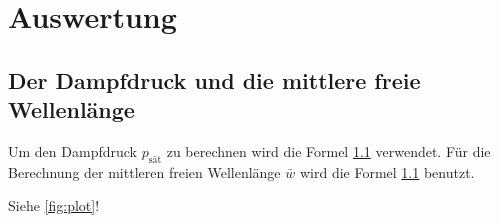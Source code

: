 \section{Auswertung}
\label{sec:Auswertung}

\subsection{Der Dampfdruck und die mittlere freie Wellenlänge}

Um den Dampfdruck $p_\text{sät}$ zu berechnen wird die Formel \ref{} verwendet.
Für die Berechnung der mittleren freien Wellenlänge $\bar{w}$ wird die Formel \ref{} benutzt.



Siehe \autoref{fig:plot}!
